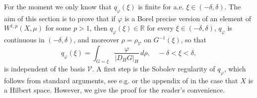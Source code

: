 \documentclass[reqno,twoside,12pt]{amsart}
\begin{document}
For the moment we only know that $q_{\varphi}(\xi)$ is finite for a.e. $\xi \in (-\delta, \delta)$. 
The aim of this section is to prove that  if $\varphi$ is a Borel precise version of an element of $W^{1,p}(X, \mu)$ for some $p>1$, then $ q_{\varphi}(\xi)\in {\mathbb R}$ for every $\xi \in (-\delta, \delta)$,  $ q_{\varphi}$ is continuous in $(-\delta, \delta)$, and moreover $\rho = \rho_{\mathcal V}$ on $G^{-1}(\xi)$, so that 
\begin{equation}
\label{qvarphirho}
 q_{\varphi}(\xi) = \int_{G=\xi}\frac{\varphi}{|D_HG|_H}\,d\rho   , \quad -\delta <\xi<\delta ,
\end{equation}
is independent of the basis $\mathcal V$.  A first step is the Sobolev regularity of $ q_{\varphi}$, which follows from standard arguments, see e.g.  \cite[Ex. 6.9.4]{Boga} or  the appendix of \cite{DPL} in the case that $X$ is a Hilbert space. However, we give the proof for the reader's convenience. 
\end{document}
